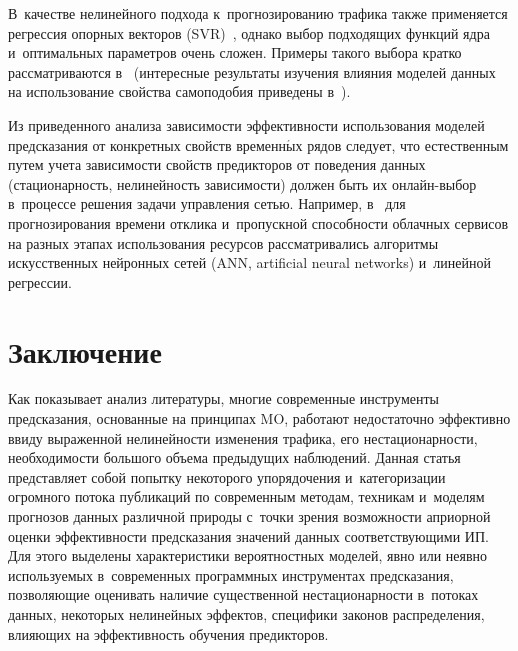 \begin{multicols}{2}
  В~качестве нелинейного подхода к~прогнозированию трафика также 
применяется регрессия опорных векторов (SVR)~\cite{23-fr}, однако выбор 
подходящих функций ядра и~оптимальных параметров очень сложен. 
Примеры такого выбора кратко рас\-смат\-ри\-ва\-ют\-ся в~\cite{26-fr} (интересные 
результаты изучения влияния моделей данных на использование свойства 
самоподобия приведены в~\cite{27-fr}). 
  
  Из приведенного анализа зависимости эффективности использования 
моделей предсказания от конкретных свойств временн$\acute{\mbox{ы}}$х рядов следует, что 
естественным путем учета зависимости свойств предикторов от поведения 
данных (стационарность, нелинейность зависимости) должен быть их  
он\-лайн-вы\-бор в~процессе решения задачи управления сетью. Например, 
в~\cite{27-fr} для прогнозирования времени отклика и~пропускной 
способности облачных сервисов на разных этапах использования ресурсов 
рассматривались алгоритмы искусственных нейронных сетей (ANN, artificial neural networks) 
и~линейной регрессии. 


\section{Заключение}


  Как показывает анализ литературы, многие современные инструменты 
предсказания, основанные на принципах MO, работают недостаточно 
эффективно ввиду выраженной нелинейности \mbox{изменения} трафика, его 
нестационарности, необходимости большого объема предыду\-щих 
наблюдений. Данная статья представляет собой попытку некоторого 
упорядочения и~категоризации огромного потока публикаций по 
современным методам, техникам и~моделям прогнозов данных различной 
природы с~точки зрения возможности априорной оценки эффективности 
предсказания значений данных соответствующими ИП. Для этого выделены 
характеристики вероятностных моделей, явно или неявно используемых 
в~современных программных инструментах предсказания, позволяющие 
оценивать наличие существенной нестационарности в~потоках данных, 
некоторых нелинейных эффектов, специфики законов распределения, 
влияющих на эффективность обучения предикторов. 
  

\end{multicols}
